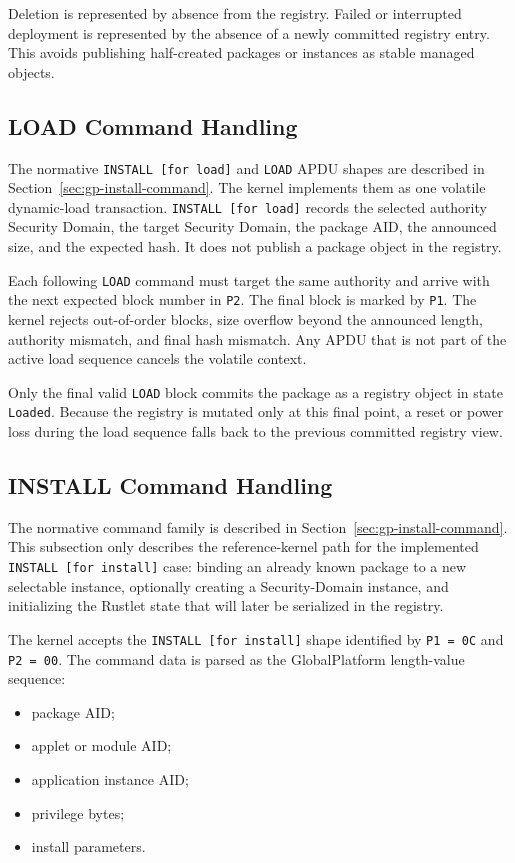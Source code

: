 Deletion is represented by absence from the registry. Failed or interrupted
deployment is represented by the absence of a newly committed registry entry.
This avoids publishing half-created packages or instances as stable managed
objects.

\subsection{LOAD Command Handling}
\label{sec:impl-load}

The normative \texttt{INSTALL [for load]} and \texttt{LOAD} APDU shapes are
described in Section~\ref{sec:gp-install-command}. The kernel implements them
as one volatile dynamic-load transaction. \texttt{INSTALL [for load]} records
the selected authority Security Domain, the target Security Domain, the package
AID, the announced size, and the expected hash. It does not publish a package
object in the registry.

Each following \texttt{LOAD} command must target the same authority and arrive
with the next expected block number in \texttt{P2}. The final block is marked
by \texttt{P1}. The kernel rejects out-of-order blocks, size overflow beyond
the announced length, authority mismatch, and final hash mismatch. Any APDU
that is not part of the active load sequence cancels the volatile context.

Only the final valid \texttt{LOAD} block commits the package as a registry
object in state \texttt{Loaded}. Because the registry is mutated only at this
final point, a reset or power loss during the load sequence falls back to the
previous committed registry view.

\subsection{INSTALL Command Handling}
\label{sec:impl-install}

The normative command family is described in
Section~\ref{sec:gp-install-command}. This subsection only describes the
reference-kernel path for the implemented \texttt{INSTALL [for install]} case:
binding an already known package to a new selectable instance, optionally
creating a Security-Domain instance, and initializing the Rustlet state that
will later be serialized in the registry.

The kernel accepts the \texttt{INSTALL [for install]} shape identified by
\texttt{P1 = 0C} and \texttt{P2 = 00}. The command data is parsed as the
GlobalPlatform length-value sequence:
\begin{itemize}
\item package AID;
\item applet or module AID;
\item application instance AID;
\item privilege bytes;
\item install parameters.
\end{itemize}

